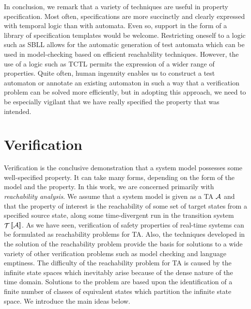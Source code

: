 {In conclusion, we remark that a variety of techniques are useful in
property specification. Most often, specifications are more succinctly
and clearly expressed with temporal logic than with automata. Even so,
support in the form of a library of specification templates would be
welcome.  Restricting oneself to a logic such as SBLL allows for the
automatic generation of test automata which can be used in
model-checking based on efficient reachability techniques. However, the use
of a logic such as TCTL permits the expression of a wider range of
properties.  Quite often, human ingenuity enables us to construct a
test automaton or annotate an existing automaton in such a way
that a verification problem can be solved more efficiently, but in
adopting this approach, we need to be especially vigilant that we have
really specified the property that was intended.
  
\section{Verification}\label{sec:mscverif}
Verification is the conclusive demonstration that a system model
possesses some well-specified property. It can take many forms,
depending on the form of the model and the property. In this work, we
are concerned primarily with \emph{reachability analysis}. We assume
that a system model is given as a TA $\AA$ and that the
property of interest is the reachability of some set of target states
from a specified source state, along some time-divergent run in the
transition system $\TSys{\AA}$. As we have seen, verification of
safety properties of real-time systems can be formulated as
reachability problems for TA. Also, the techniques
developed in the solution of the reachability problem provide the
basis for solutions to a wide variety of other verification problems
such as model checking and language emptiness. The difficulty of the
reachability problem for TA is caused by the infinite
state spaces which inevitably arise because of the dense nature of the time
domain. Solutions to the problem are based upon the identification of
a finite number of classes of equivalent states which partition the
infinite state space. We introduce the main ideas below.
 
}
